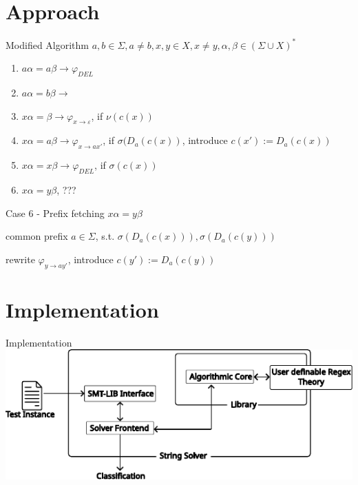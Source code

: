 \documentclass[xcolor=table]{beamer}
\newcommand{\xmark}{\ding{55}}%
\begin{document}
\section{Approach}
\begin{frame}{Modified Algorithm}
\pause
$a, b \in \Sigma, a \neq b, x, y \in X, x \neq y, \alpha, \beta \in (\Sigma \cup X)^*$ \\

\begin{enumerate}
    \pause
    \item $a\alpha = a\beta \rightarrow \varphi_{DEL}$
    \pause
    \item $a\alpha = b\beta \rightarrow$ \xmark
    \pause
    \item $x\alpha = \beta \rightarrow \varphi_{x \rightarrow \varepsilon}$\pause, {\color{green}if $\nu(c(x))$}
    \pause
    \item $x\alpha = a\beta \rightarrow \varphi_{x \rightarrow ax'}$\pause,
    {\color{green}if $\sigma(D_a(c(x))$\pause, introduce $c(x') := D_a(c(x))$}
    \pause
    \item $x\alpha = x\beta \rightarrow \varphi_{DEL}$\pause,
    {\color{green}if $\sigma(c(x))$}
    \pause
    \item $x\alpha = y\beta$\pause,
    {\color{green}???}
\end{enumerate}

\end{frame}

\begin{frame}{Case 6 - Prefix fetching}
$x\alpha = y\beta$

\pause
common prefix $a \in \Sigma$, s.t. $\sigma(D_a(c(x))), \sigma(D_a(c(y)))$

\pause
rewrite $\varphi_{y \rightarrow ay'}$\pause, introduce $c(y') := D_a(c(y))$
\end{frame}


\section{Implementation}
\begin{frame}{Implementation}
\pause
\centering
\includegraphics[]{images/architecture.pdf}
\end{frame}
\end{document}
